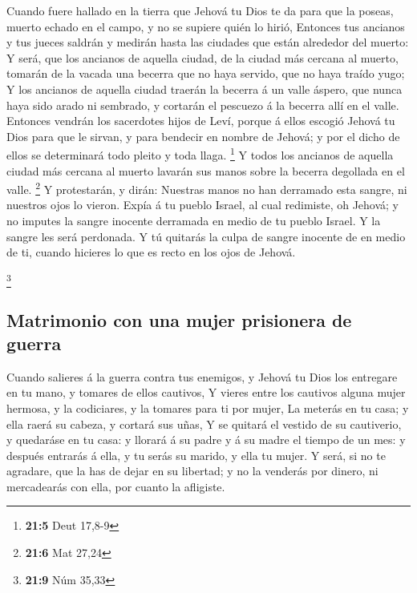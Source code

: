  Cuando fuere hallado en la tierra que Jehová tu Dios te da
para que la poseas, muerto echado en el campo, y no se supiere quién lo
hirió,  Entonces tus ancianos y tus jueces saldrán y medirán
hasta las ciudades que están alrededor del muerto:  Y será,
que los ancianos de aquella ciudad, de la ciudad más cercana al muerto,
tomarán de la vacada una becerra que no haya servido, que no haya traído
yugo;  Y los ancianos de aquella ciudad traerán la becerra á
un valle áspero, que nunca haya sido arado ni sembrado, y cortarán el
pescuezo á la becerra allí en el valle.  Entonces vendrán
los sacerdotes hijos de Leví, porque á ellos escogió Jehová tu Dios para
que le sirvan, y para bendecir en nombre de Jehová; y por el dicho de
ellos se determinará todo pleito y toda llaga. \footnote{\textbf{21:5}
  Deut 17,8-9}  Y todos los ancianos de aquella ciudad más
cercana al muerto lavarán sus manos sobre la becerra degollada en el
valle. \footnote{\textbf{21:6} Mat 27,24}  Y protestarán, y
dirán: Nuestras manos no han derramado esta sangre, ni nuestros ojos lo
vieron.  Expía á tu pueblo Israel, al cual redimiste, oh
Jehová; y no imputes la sangre inocente derramada en medio de tu pueblo
Israel. Y la sangre les será perdonada.  Y tú quitarás la
culpa de sangre inocente de en medio de ti, cuando hicieres lo que es
recto en los ojos de Jehová.

\footnote{\textbf{21:9} Núm 35,33}

\hypertarget{matrimonio-con-una-mujer-prisionera-de-guerra}{%
\subsection{Matrimonio con una mujer prisionera de
guerra}\label{matrimonio-con-una-mujer-prisionera-de-guerra}}

 Cuando salieres á la guerra contra tus enemigos, y Jehová
tu Dios los entregare en tu mano, y tomares de ellos cautivos,
 Y vieres entre los cautivos alguna mujer hermosa, y la
codiciares, y la tomares para ti por mujer,  La meterás en
tu casa; y ella raerá su cabeza, y cortará sus uñas,  Y se
quitará el vestido de su cautiverio, y quedaráse en tu casa: y llorará á
su padre y á su madre el tiempo de un mes: y después entrarás á ella, y
tu serás su marido, y ella tu mujer.  Y será, si no te
agradare, que la has de dejar en su libertad; y no la venderás por
dinero, ni mercadearás con ella, por cuanto la afligiste.

